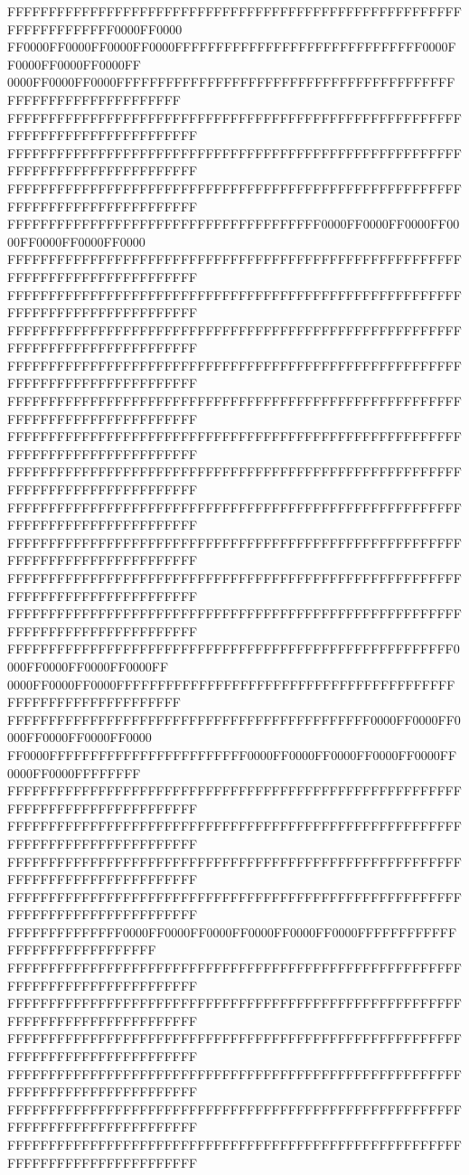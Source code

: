 FFFFFFFFFFFFFFFFFFFFFFFFFFFFFFFFFFFFFFFFFFFFFFFFFFFFFFFFFFFFFFFFFFFF0000FF0000
FF0000FF0000FF0000FF0000FFFFFFFFFFFFFFFFFFFFFFFFFFFFFF0000FF0000FF0000FF0000FF
0000FF0000FF0000FFFFFFFFFFFFFFFFFFFFFFFFFFFFFFFFFFFFFFFFFFFFFFFFFFFFFFFFFFFFFF
FFFFFFFFFFFFFFFFFFFFFFFFFFFFFFFFFFFFFFFFFFFFFFFFFFFFFFFFFFFFFFFFFFFFFFFFFFFFFF
FFFFFFFFFFFFFFFFFFFFFFFFFFFFFFFFFFFFFFFFFFFFFFFFFFFFFFFFFFFFFFFFFFFFFFFFFFFFFF
FFFFFFFFFFFFFFFFFFFFFFFFFFFFFFFFFFFFFFFFFFFFFFFFFFFFFFFFFFFFFFFFFFFFFFFFFFFFFF
FFFFFFFFFFFFFFFFFFFFFFFFFFFFFFFFFFFFFF0000FF0000FF0000FF0000FF0000FF0000FF0000
FFFFFFFFFFFFFFFFFFFFFFFFFFFFFFFFFFFFFFFFFFFFFFFFFFFFFFFFFFFFFFFFFFFFFFFFFFFFFF
FFFFFFFFFFFFFFFFFFFFFFFFFFFFFFFFFFFFFFFFFFFFFFFFFFFFFFFFFFFFFFFFFFFFFFFFFFFFFF
FFFFFFFFFFFFFFFFFFFFFFFFFFFFFFFFFFFFFFFFFFFFFFFFFFFFFFFFFFFFFFFFFFFFFFFFFFFFFF
FFFFFFFFFFFFFFFFFFFFFFFFFFFFFFFFFFFFFFFFFFFFFFFFFFFFFFFFFFFFFFFFFFFFFFFFFFFFFF
FFFFFFFFFFFFFFFFFFFFFFFFFFFFFFFFFFFFFFFFFFFFFFFFFFFFFFFFFFFFFFFFFFFFFFFFFFFFFF
FFFFFFFFFFFFFFFFFFFFFFFFFFFFFFFFFFFFFFFFFFFFFFFFFFFFFFFFFFFFFFFFFFFFFFFFFFFFFF
FFFFFFFFFFFFFFFFFFFFFFFFFFFFFFFFFFFFFFFFFFFFFFFFFFFFFFFFFFFFFFFFFFFFFFFFFFFFFF
FFFFFFFFFFFFFFFFFFFFFFFFFFFFFFFFFFFFFFFFFFFFFFFFFFFFFFFFFFFFFFFFFFFFFFFFFFFFFF
FFFFFFFFFFFFFFFFFFFFFFFFFFFFFFFFFFFFFFFFFFFFFFFFFFFFFFFFFFFFFFFFFFFFFFFFFFFFFF
FFFFFFFFFFFFFFFFFFFFFFFFFFFFFFFFFFFFFFFFFFFFFFFFFFFFFFFFFFFFFFFFFFFFFFFFFFFFFF
FFFFFFFFFFFFFFFFFFFFFFFFFFFFFFFFFFFFFFFFFFFFFFFFFFFFFFFFFFFFFFFFFFFFFFFFFFFFFF
FFFFFFFFFFFFFFFFFFFFFFFFFFFFFFFFFFFFFFFFFFFFFFFFFFFFFF0000FF0000FF0000FF0000FF
0000FF0000FF0000FFFFFFFFFFFFFFFFFFFFFFFFFFFFFFFFFFFFFFFFFFFFFFFFFFFFFFFFFFFFFF
FFFFFFFFFFFFFFFFFFFFFFFFFFFFFFFFFFFFFFFFFFFF0000FF0000FF0000FF0000FF0000FF0000
FF0000FFFFFFFFFFFFFFFFFFFFFFFF0000FF0000FF0000FF0000FF0000FF0000FF0000FFFFFFFF
FFFFFFFFFFFFFFFFFFFFFFFFFFFFFFFFFFFFFFFFFFFFFFFFFFFFFFFFFFFFFFFFFFFFFFFFFFFFFF
FFFFFFFFFFFFFFFFFFFFFFFFFFFFFFFFFFFFFFFFFFFFFFFFFFFFFFFFFFFFFFFFFFFFFFFFFFFFFF
FFFFFFFFFFFFFFFFFFFFFFFFFFFFFFFFFFFFFFFFFFFFFFFFFFFFFFFFFFFFFFFFFFFFFFFFFFFFFF
FFFFFFFFFFFFFFFFFFFFFFFFFFFFFFFFFFFFFFFFFFFFFFFFFFFFFFFFFFFFFFFFFFFFFFFFFFFFFF
FFFFFFFFFFFFFF0000FF0000FF0000FF0000FF0000FF0000FFFFFFFFFFFFFFFFFFFFFFFFFFFFFF
FFFFFFFFFFFFFFFFFFFFFFFFFFFFFFFFFFFFFFFFFFFFFFFFFFFFFFFFFFFFFFFFFFFFFFFFFFFFFF
FFFFFFFFFFFFFFFFFFFFFFFFFFFFFFFFFFFFFFFFFFFFFFFFFFFFFFFFFFFFFFFFFFFFFFFFFFFFFF
FFFFFFFFFFFFFFFFFFFFFFFFFFFFFFFFFFFFFFFFFFFFFFFFFFFFFFFFFFFFFFFFFFFFFFFFFFFFFF
FFFFFFFFFFFFFFFFFFFFFFFFFFFFFFFFFFFFFFFFFFFFFFFFFFFFFFFFFFFFFFFFFFFFFFFFFFFFFF
FFFFFFFFFFFFFFFFFFFFFFFFFFFFFFFFFFFFFFFFFFFFFFFFFFFFFFFFFFFFFFFFFFFFFFFFFFFFFF
FFFFFFFFFFFFFFFFFFFFFFFFFFFFFFFFFFFFFFFFFFFFFFFFFFFFFFFFFFFFFFFFFFFFFFFFFFFFFF
